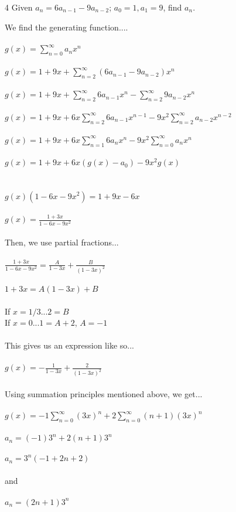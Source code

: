 \documentclass[11pt,twosided]{article}
\begin{document}
\begin{problem} 4
Given $a_n = 6a_{n-1} - 9a_{n-2}$; $a_0 = 1, a_1 = 9$, find $a_n$.
\end{problem}
\begin{solution}
We find the generating function....\\\\
$g(x) = \sum_{n = 0}^\infty a_nx^n$\\\\
$g(x) = 1 + 9x + \sum_{n = 2}^\infty (6a_{n-1} - 9a_{n-2})x^n$\\\\
$g(x) = 1 + 9x + \sum_{n = 2}^\infty 6a_{n-1}x^n - \sum_{n = 2}^\infty 9a_{n-2}x^n$\\\\
$g(x) = 1 + 9x + 6x\sum_{n = 2}^\infty 6a_{n-1}x^{n-1} - 9x^2\sum_{n = 2}^\infty a_{n-2}x^{n-2}$\\\\
$g(x) = 1 + 9x + 6x\sum_{n = 1}^\infty 6a_{n}x^{n} - 9x^2\sum_{n = 0}^\infty a_{n}x^{n}$\\\\
$g(x) = 1 + 9x + 6x(g(x) - a_0) - 9x^2g(x)$\\\\\\
$g(x)(1 - 6x - 9x^2) = 1 + 9x - 6x$\\\\
$g(x) = \frac{1 + 3x}{1 - 6x - 9x^2}$\\\\
Then, we use partial fractions...\\\\
$\frac{1 + 3x}{1 - 6x - 9x^2} = \frac{A}{1 - 3x} + \frac{B}{(1 - 3x)^2}$\\\\
$1 + 3x = A(1 - 3x) + B$\\\\
If $x = 1/3$...$2 = B$\\
If $x = 0$...$1 = A + 2$, $A = -1$\\\\
This gives us an expression like so...\\\\
$g(x) = -\frac{1}{1 - 3x} + \frac{2}{(1 - 3x)^2}$\\\\
Using summation principles mentioned above, we get...\\\\
$g(x) = -1\sum_{n = 0}^\infty (3x)^n + 2\sum_{n = 0}^\infty (n + 1)(3x)^n$\\\\
$a_n = (-1)3^n + 2(n + 1)3^n$\\\\
$a_n = 3^n(-1 + 2n + 2)$\\\\
and\\\\
$a_n = (2n + 1)3^n$

\end{solution} \\
\end{document}
